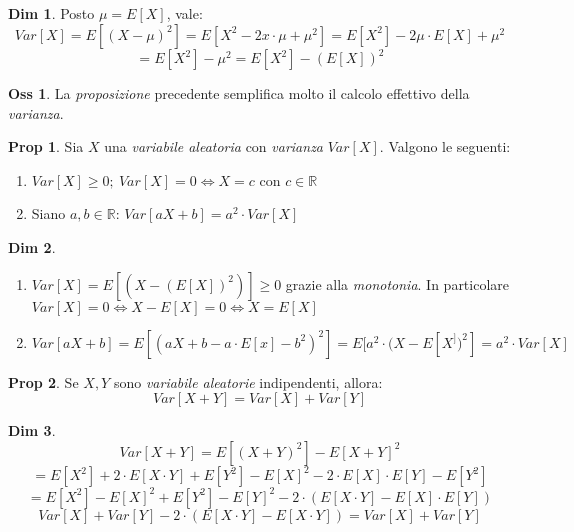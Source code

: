\documentclass[12pt, a4paper]{report}
\theoremstyle{definition}
\newtheorem*{demonstration}{Dim}
\newtheorem*{proposition}{Prop}
\newtheorem*{observation}{Oss}
\DeclareRobustCommand{\R}{\mathbb{R}}%
\begin{document}
\begin{demonstration}
	Posto \(\mu=E[X]\), vale:
	\[Var[X]=E[(X-\mu)^2]=E[X^2-2x\cdot \mu+\mu^2]=E[X^2]-2\mu\cdot E[X]+\mu^2\]
	\[=E[X^2]-\mu^2=E[X^2]-(E[X])^2\]
\end{demonstration}
\begin{observation}
	La \emph{proposizione} precedente semplifica molto il calcolo effettivo della
	\emph{varianza}.
\end{observation}
\begin{proposition}
	Sia $X$ una \emph{variabile aleatoria} con \emph{varianza} $Var[X]$. Valgono
	le seguenti:
	\begin{enumerate}[label=(\roman*)]
		\item \(Var[X]\geq 0;\ Var[X]=0\Leftrightarrow X=c\) con $c\in\R$
		\item Siano $a,b\in\R$: \(Var[aX+b]=a^2\cdot Var[X]\)
	\end{enumerate}
\end{proposition}

\begin{demonstration}
	\mbox{}
	\begin{enumerate}[label=(\roman*)]
		\item \(Var[X]=E[(X-(E[X])^2)]\geq 0\) grazie alla \emph{monotonia}.
		In particolare $Var[X]=0\Leftrightarrow X-E[X]=0\Leftrightarrow X=E[X]$
		\item \(Var[aX+b]=E[(aX+b-a\cdot E[x]-b^2)^2]=E[a^2\cdot (X-E[X^])^2]=a^2\cdot Var[X]\)
	\end{enumerate}
\end{demonstration}

\begin{proposition}
	Se $X,Y$ sono \emph{variabile aleatorie} indipendenti, allora:
	\[Var[X+Y]=Var[X]+Var[Y]\]
\end{proposition}
\begin{demonstration}
	\[Var[X+Y]=E[(X+Y)^2]-E[X+Y]^2\]
	\[=E[X^2]+2\cdot E[X\cdot Y]+E[Y^2]-E[X]^2-2\cdot E[X]\cdot E[Y]-E[Y^2]\]
	\[=E[X^2]-E[X]^2+E[Y^2]-E[Y]^2-2\cdot (E[X\cdot Y]-E[X]\cdot E[Y])\]
	\[Var[X]+Var[Y]-2\cdot (E[X\cdot Y]-E[X\cdot Y])=Var[X]+Var[Y]\]
\end{demonstration}
\end{document}
